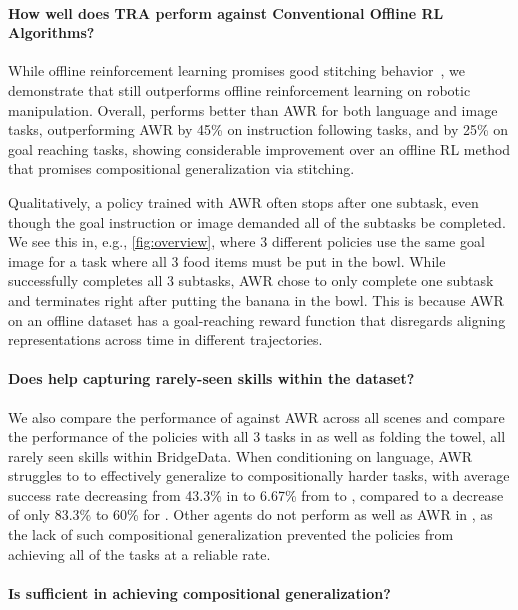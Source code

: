 \paragraph{How well does TRA perform against Conventional Offline RL Algorithms?} While offline reinforcement learning promises good stitching behavior~\citep{kumar2021should}, we demonstrate that \Method{} still outperforms offline reinforcement learning on robotic manipulation.
Overall, \Method{} performs better than AWR for both language and image tasks, outperforming AWR by 45\% on instruction following tasks, and by 25\% on goal reaching tasks, showing considerable improvement over an offline RL method that promises compositional generalization via stitching.

Qualitatively, a policy trained with AWR often stops after one subtask, even though the goal instruction or image demanded all of the subtasks be completed.
We see this in, e.g., \cref{fig:overview}, where 3 different policies use the same goal image for a task where all 3 food items must be put in the bowl.
While \Method{} successfully completes all 3 subtasks, AWR chose to only complete one subtask and terminates right after putting the banana in the bowl.
This is because AWR on an offline dataset has a goal-reaching reward function that disregards aligning representations across time in different trajectories.

\paragraph{Does \Method{} help capturing rarely-seen skills within the dataset?}

We also compare the performance of \Method{} against AWR across all scenes and compare the performance of the policies with all 3 tasks in  as well as folding the towel, all rarely seen skills within BridgeData.
When conditioning on language, AWR struggles to to effectively generalize to compositionally harder tasks, with average success rate decreasing from 43.3\% in to 6.67\% from  to , compared to a decrease of only 83.3\% to 60\% for \Method{}. Other agents do not perform as well as AWR in , as the lack of such compositional generalization prevented the policies from achieving all of the tasks at a reliable rate.

\paragraph{Is \Method{} sufficient in achieving compositional generalization?}

